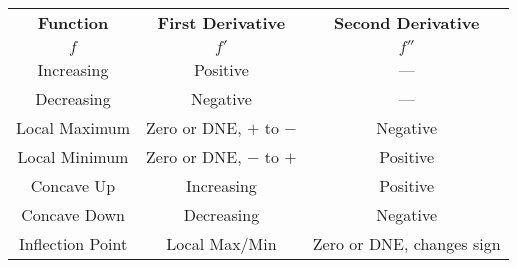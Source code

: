 \documentclass[12pt]{article}
\begin{document}
\begin{center}
\renewcommand{\arraystretch}{1.25}
\begin{tabular}{|c||c|c|}
\hline
\textbf{Function} & \textbf{First Derivative} & \textbf{Second Derivative} \\
$f$ & $f'$ & $f''$ \\
\hline
Increasing & Positive & --- \\
\hline
Decreasing & Negative & --- \\
\hline
Local Maximum & Zero or DNE, $+$ to $-$ & Negative \\
\hline
Local Minimum & Zero or DNE, $-$ to $+$ & Positive\\
\hline
Concave Up & Increasing & Positive \\
\hline
Concave Down & Decreasing & Negative \\
\hline
Inflection Point & Local Max/Min & Zero or DNE, changes sign \\
\hline
\end{tabular}
\end{center}
\end{document}

